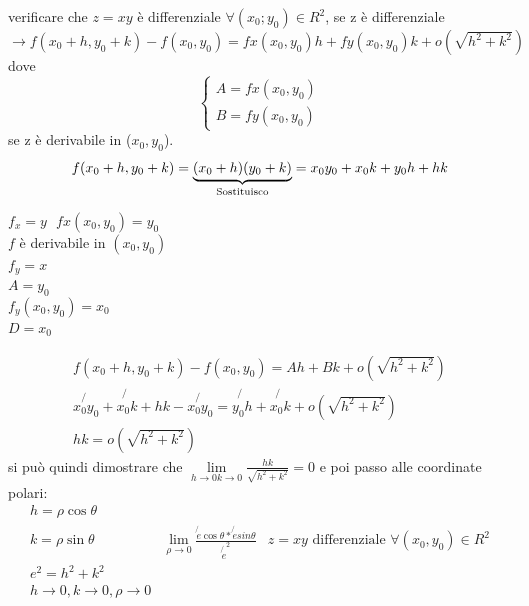 \begin{esempio}
  verificare che $z=xy$ è differenziale $\forall (x_0;y_0)\in R^2$, se z è differenziale\\
  $\to f(x_0+h,y_0+k) - f(x_0,y_0)=fx(x_0,y_0)h+fy(x_0,y_0)k+o(\sqrt{h^2+k^2})$ dove
  \begin{equation*}
    \begin{cases}
      A=fx(x_0,y_0)\\
      B=fy(x_0,y_0)
    \end{cases}
  \end{equation*}
  se z è derivabile in ($x_0,y_0$).
  \begin{equation*}
    f(x_0+h,y_0+k) =\underbrace{(x_0+h)(y_0+k)}_{\text{\shortstack{Sostituisco}}}=x_0y_0+x_0k+y_0h+hk
  \end{equation*}
  \begin{multicols}{3}
    $f_x=y\text{ }fx(x_0,y_0)=y_0$\\
    $f$ è derivabile in $(x_0,y_0)$\\
    $f_y=x$\\
    $A=y_0$\\
    $f_y(x_0,y_0)=x_0$\\
    $D=x_0$
  \end{multicols}
  \begin{equation*}
    \begin{matrix}
      f(x_0+h,y_0+k) - f(x_0,y_0)=Ah+Bk+o(\sqrt{h^2+k^2})\\
      \not{x_0y_0}+\not{x_0k}+hk-\not{x_0y_0}=\not{y_0h}+\not{x_0k}+o(\sqrt{h^2+k^2})\\
      hk=o(\sqrt{h^2+k^2})
    \end{matrix}
  \end{equation*}
  si può quindi dimostrare che $\lim\limits_{h\to 0 k\to 0}\frac{hk}{\sqrt{h^2+k^2}}=0$
  e poi passo alle coordinate polari:
  \begin{equation*}
    \begin{matrix}
      h=\rho \cos \theta\\
      k=\rho \sin \theta & \lim\limits_{\rho\to 0} \frac{\not{e} \cos\theta*
		\not{e} sin\theta}{\not{e}^2}& z=xy \text{ differenziale } \forall (x_0,y_0)\in R^2\\
      e^2=h^2+k^2\\
      h\to0,k\to 0,\rho \to 0\\
    \end{matrix}
  \end{equation*}  
\end{esempio}
